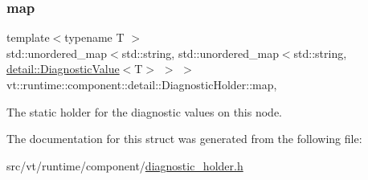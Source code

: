 \subsubsection{\texorpdfstring{map}{map}}
{\footnotesize\ttfamily template$<$typename T $>$ \\
std\+::unordered\+\_\+map$<$std\+::string, std\+::unordered\+\_\+map$<$std\+::string, \hyperlink{structvt_1_1runtime_1_1component_1_1detail_1_1_diagnostic_value}{detail\+::\+Diagnostic\+Value}$<$T$>$ $>$ $>$ vt\+::runtime\+::component\+::detail\+::\+Diagnostic\+Holder\+::map\hspace{0.3cm}{\ttfamily [static]}, {\ttfamily [private]}}



The static holder for the diagnostic values on this node. 



The documentation for this struct was generated from the following file\+:\begin{DoxyCompactItemize}
\item 
src/vt/runtime/component/\hyperlink{diagnostic__holder_8h}{diagnostic\+\_\+holder.\+h}\end{DoxyCompactItemize}
